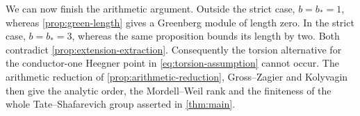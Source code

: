 We can now finish the arithmetic argument.  Outside the strict case,
$b=b_*=1$, whereas \cref{prop:green-length} gives a Greenberg module of
length zero.  In the strict case, $b=b_*=3$, whereas the same
proposition bounds its length by two.  Both contradict
\cref{prop:extension-extraction}.  Consequently the torsion
alternative for the conductor-one Heegner point in
\cref{eq:torsion-assumption} cannot occur.  The arithmetic reduction
of \cref{prop:arithmetic-reduction},
Gross--Zagier and Kolyvagin then give the analytic order, the
Mordell--Weil rank and the finiteness of the whole Tate--Shafarevich
group asserted in \cref{thm:main}.
